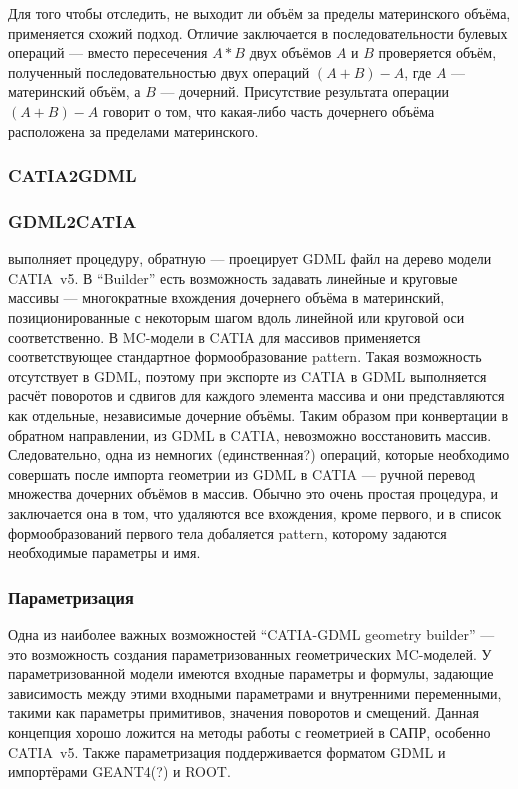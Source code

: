 Для того чтобы отследить, не выходит ли объём за пределы материнского объёма, применяется схожий подход. Отличие заключается в последовательности булевых операций --- вместо пересечения $A*B$ двух объёмов $A$ и $B$ проверяется объём, полученный последовательностью двух операций $(A+B)-A$, где $A$ --- материнский объём, а $B$ --- дочерний. Присутствие результата операции $(A+B)-A$ говорит о том, что какая-либо часть дочернего объёма расположена за пределами материнского.

\subsubsection{CATIA2GDML}\label{sec:CATIA2GDML}


\subsubsection{GDML2CATIA}\label{sec:GDML2CATIA}

 выполняет процедуру, обратную  --- проецирует GDML файл на дерево модели CATIA~v5. В ``Builder'' есть возможность задавать линейные и круговые массивы --- многократные вхождения дочернего объёма в материнский, позиционированные с некоторым шагом вдоль линейной или круговой оси соответственно. В MC-модели в CATIA для массивов применяется соответствующее стандартное формообразование pattern. Такая возможность отсутствует в GDML, поэтому при экспорте из CATIA в GDML выполняется расчёт поворотов и сдвигов для каждого элемента массива и они представляются как отдельные, независимые дочерние объёмы. Таким образом при конвертации в обратном направлении, из GDML в CATIA, невозможно восстановить массив. Следовательно, одна из немногих (единственная?) операций, которые необходимо совершать после импорта геометрии из GDML в CATIA --- ручной перевод множества дочерних объёмов в массив. Обычно это очень простая процедура, и заключается она в том, что удаляются все вхождения, кроме первого, и в список формообразований первого тела добаляется pattern, которому задаются необходимые параметры и имя.

\subsubsection{Параметризация}\label{sec:Parameterization}

Одна из наиболее важных возможностей ``CATIA-GDML geometry builder'' --- это возможность создания параметризованных геометрических MC-моделей. У параметризованной модели имеются входные параметры и формулы, задающие зависимость между этими входными параметрами и внутренними переменными, такими как параметры примитивов, значения поворотов и смещений. Данная концепция хорошо ложится на методы работы с геометрией в САПР, особенно CATIA~v5. Также параметризация поддерживается форматом GDML и импортёрами GEANT4(?) и ROOT.

